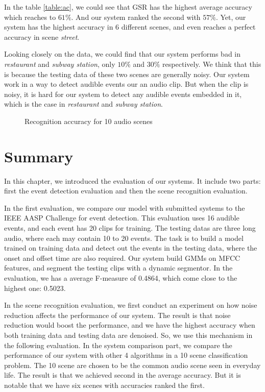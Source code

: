 In the table \ref{table:ac}, we could see that GSR has the highest average accuracy which reaches to $61\%$. 
And our system ranked the second with $57\%$. 
Yet, our system has the highest accuracy in 6 different scenes, and even reaches a perfect accuracy in scene \textit{street}. 

Looking closely on the data, we could find that our system performs bad in \textit{restaurant} and \textit{subway station}, only $10\%$ and $30\%$ respectively. 
We think that this is because the testing data of these two scenes are generally noisy. 
Our system work in a way to detect audible events our an audio clip. 
But when the clip is noisy, it is hard for our system to detect any audible events embedded in it, which is the case in \textit{restaurant} and \textit{subway station}. 

\begin{figure}[htb!]
\centering

\caption{Recognition accuracy for 10 audio scenes}
\label{fig:sceneeval}
\end{figure}


\section{Summary}
In this chapter, we introduced the evaluation of our systems. 
It include two parts: first the event detection evaluation and then the scene recognition evaluation.

In the first evaluation, we compare our model with submitted systems to the IEEE AASP Challenge for event detection. 
This evaluation uses 16 audible events, and each event has 20 clips for training. 
The testing datas are three long audio, where each may contain 10 to 20 events. 
The task is to build a model trained on training data and detect out the events in the testing data, where the onset and offset time are also required. 
Our system build GMMs on MFCC features, and segment the testing clips with a dynamic segmentor. 
In the evaluation, we has a average F-measure of 0.4864, which come close to the highest one: 0.5023. 

In the scene recognition evaluation, we first conduct an experiment on how noise reduction affects the performance of our system. 
The result is that noise reduction would boost the performance, and we have the highest accuracy when both training data and testing data are denoised. 
So, we use this mechanism in the following evaluation. 
In the system comparison part, we compare the performance of our system with other 4 algorithms in a 10 scene classification problem. 
The 10 scene are chosen to be the common audio scene seen in everyday life. 
The result is that we achieved second in the average accuracy. 
But it is notable that we have six scenes with accuracies ranked the first.  
